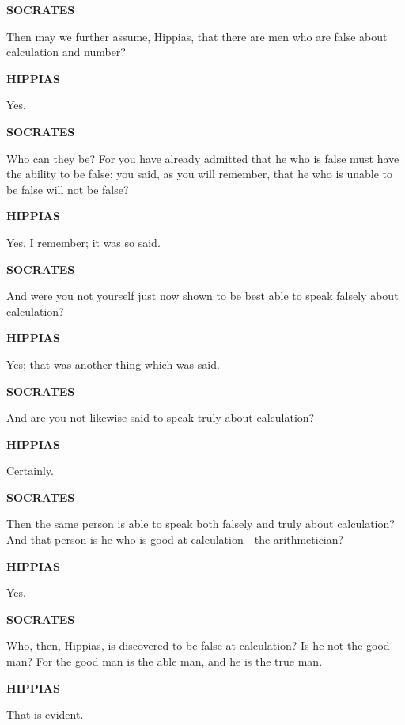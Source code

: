 \documentclass[11pt,letter]{article}
\begin{document}
\par \textbf{SOCRATES}
\par   Then may we further assume, Hippias, that there are men who are false about calculation and number?

\par \textbf{HIPPIAS}
\par   Yes.

\par \textbf{SOCRATES}
\par   Who can they be? For you have already admitted that he who is false must have the ability to be false:  you said, as you will remember, that he who is unable to be false will not be false?

\par \textbf{HIPPIAS}
\par   Yes, I remember; it was so said.

\par \textbf{SOCRATES}
\par   And were you not yourself just now shown to be best able to speak falsely about calculation?

\par \textbf{HIPPIAS}
\par   Yes; that was another thing which was said.

\par \textbf{SOCRATES}
\par   And are you not likewise said to speak truly about calculation?

\par \textbf{HIPPIAS}
\par   Certainly.

\par \textbf{SOCRATES}
\par   Then the same person is able to speak both falsely and truly about calculation? And that person is he who is good at calculation—the arithmetician?

\par \textbf{HIPPIAS}
\par   Yes.

\par \textbf{SOCRATES}
\par   Who, then, Hippias, is discovered to be false at calculation? Is he not the good man? For the good man is the able man, and he is the true man.

\par \textbf{HIPPIAS}
\par   That is evident.
\end{document}
